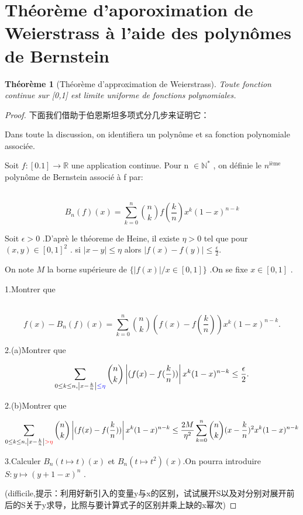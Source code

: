 \documentclass[12pt]{book}
\theoremstyle{definition}\newtheorem{dfn}{Définition}[chapter]
\theoremstyle{plain}\newtheorem{thm}{Théorème}[chapter]
\theoremstyle{plain}\newtheorem{prp}{Proposition}[chapter]
\theoremstyle{plain}\newtheorem{lem}{\bf Lemme}[chapter]
\theoremstyle{plain}\newtheorem{axm}{\bf Axiome}[chapter]
\theoremstyle{plain}\newtheorem{lmm}{\bf Lemme}[chapter]
\theoremstyle{plain}\newtheorem{cor}{\bf Corollaire}[chapter]
\theoremstyle{remark}\newtheorem{rem}{Remarque}[chapter]
\begin{document}
\section{Théorème d'aporoximation de Weierstrass à l'aide des polynômes de Bernstein}
\begin{thm}[Théorème d'approximation de Weierstrass]
Toute fonction continue sur [0,1] est limite uniforme de fonctions polynomiales. 
\end{thm}
\begin{proof}
下面我们借助于伯恩斯坦多项式分几步来证明它：

Dans toute la discussion, on identifiera un polynôme et sa fonction polynomiale associée.

Soit  $f: [0.1] \rightarrow \mathbb{R}$ une application continue. Pour n $\in \mathbb N ^{*}$ , on définie le $n^{\text{ième}}$  polynôme de Bernstein associé à f par:

​$$\boxed{B_{n}(f)(x) = \sum_{k=0}^{n}\binom{n}{k}f(\frac{k}{n})x^k(1-x)^{n-k}}$$ 

Soit $\epsilon > 0$ .D'aprè le théoreme de Heine, il existe $\eta > 0$ tel que pour $(x,y) \in [0,1]^2$ . si $\left | x-y \right | \le\eta$  alors       $\left | f(x)-f(y) \right | \le\frac{\epsilon}{2}.$  

On note $M$  la borne supérieure de $\{\left |f(x)\right| / x\in [0,1]\}$ .On se fixe $x\in [0,1]$ .


1.Montrer que 

​ $$f(x)-B_{n}(f)(x) = \sum_{k=0}^{n}\binom{n}{k}(f(x)-f(\frac{k}{n}))x^k(1-x)^{n-k}.$$



2.(a)Montrer que

$$\sum_{0\le k\le n, \left | x-\frac{k}{n} \right | \color{blue}{\le}\eta}\binom{n}{k}\left|(f(x)-f(\frac{k}{n}))\right|x^k(1-x)^{n-k}\le\frac{\epsilon}{2}.$$ 

​2.(b)Montrer que 

$$\sum_{0\le k\le n, \left | x-\frac{k}{n} \right | \color{red}{>}\eta}\binom{n}{k}\left|(f(x)-f(\frac{k}{n}))\right|x^k(1-x)^{n-k}\le\frac{2M}{\eta^2}\sum_{k=0}^{n}\binom{n}{k}(x-\frac{k}{n})^2x^k(1-x)^{n-k}$$



3.Calculer $B_{n}(t\mapsto t)(x)$ et $B_{n}(t\mapsto t^2)(x)$.On pourra introduire $S:  y\mapsto (y+1-x)^n$ .

(difficile,提示：利用好新引入的变量y与x的区别，试试展开S以及对分别对展开前后的S关于y求导，比照与要计算式子的区别并乘上缺的x幂次)


\end{proof}
\end{document}
